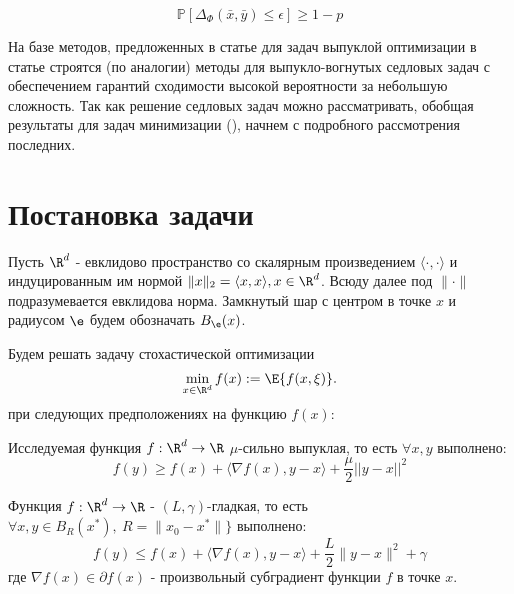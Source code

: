 \begin{equation}
    \mathbb{P}\left[\Delta_{\Phi}(\bar x,\bar y) \leq \epsilon \right] \geq 1-p 
    \label{equ: high prob guarantee}
\end{equation}

На базе методов, предложенных в статье \cite{davis2021low} для задач выпуклой оптимизации в статье \cite{li2024general} строятся (по аналогии) методы для выпукло-вогнутых седловых задач с обеспечением гарантий сходимости высокой вероятности за небольшую сложность. Так как решение седловых задач можно рассматривать, обобщая результаты для задач минимизации (\cite{воронцова2021выпуклая}), начнем с подробного рассмотрения последних.

\section{Постановка задачи}
Пусть $\R^d$ - евклидово пространство со скалярным произведением $\langle \cdot, \cdot \rangle$ и индуцированным им нормой $\|x\|_2 = \langle x, x\rangle, x \in \R^d$. Всюду далее под $\|\cdot\|$ подразумевается евклидова норма. Замкнутый шар с центром в точке $x$ и радиусом $\e$ будем обозначать $B_{\e} (x)$. 

Будем решать задачу стохастической оптимизации
    \begin{equation} \label{min_problem}
    \min_{x \in \R^d} f(x) := \E{f(x, \xi)}.  
    \end{equation}
при следующих предположениях на функцию $f(x)$:

\begin{assumption} \label{ass:convex}
    Исследуемая функция $f:\R^d \to \R$ $\mu$-сильно выпуклая, то есть $\forall x, y$ выполнено:
    \begin{equation} \label{convex}
        f(y) \ge f(x) + \langle \nabla f(x), y - x \rangle + \frac{\mu}{2} ||y - x||^2
    \end{equation}
\end{assumption}

\begin{assumption}\label{ass:smooth}
    Функция $f: \R^d \to \R$  -  $(L, \gamma)$-гладкая, то есть $\forall x, y \in B_{R} (x^*), \  R = \|x_0 - x^*\|\}$ выполнено:
\begin{equation} \label{smooth}
f(y) \leq f(x) + \langle \nabla f(x), y - x \rangle + \frac{L}{2}\|y - x\|^2 + \gamma
\end{equation}
где $\nabla f(x) \in \partial f(x)$ - произвольный субградиент функции $f$ в точке $x$.
\end{assumption}

